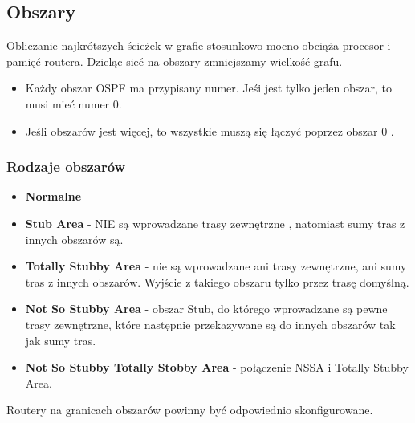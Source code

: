 \documentclass[../sk-egzamin.tex]{subfiles}
\begin{document}
\subsection*{Obszary}
Obliczanie najkrótszych ścieżek w grafie stosunkowo mocno obciąża procesor i
pamięć routera. Dzieląc sieć na obszary zmniejszamy wielkość grafu.

\begin{itemize}
    \item Każdy obszar OSPF ma przypisany numer. Jeśi jest tylko jeden obszar,
    to musi mieć numer 0.
    \item Jeśli obszarów jest więcej, to wszystkie muszą się łączyć poprzez
    obszar 0 .
\end{itemize}

\subsubsection*{Rodzaje obszarów}
\begin{itemize}
    \item \textbf{Normalne}
    \item \textbf{Stub Area} - NIE są wprowadzane trasy
    zewnętrzne ,
    natomiast sumy tras z innych obszarów są.
    \item \textbf{Totally Stubby Area} - nie są wprowadzane ani trasy
    zewnętrzne, ani sumy tras z innych obszarów.
    Wyjście z takiego obszaru tylko przez trasę domyślną.
    \item \textbf{Not So Stubby Area}  - obszar Stub, do którego
    wprowadzane są pewne  trasy zewnętrzne, które
    następnie przekazywane są do innych obszarów tak jak sumy tras.
    \item \textbf{Not So Stubby Totally Stobby Area} - połączenie NSSA i
    Totally Stubby Area.
\end{itemize}
Routery na granicach obszarów powinny być odpowiednio skonfigurowane.

\pagebreak
\end{document}
